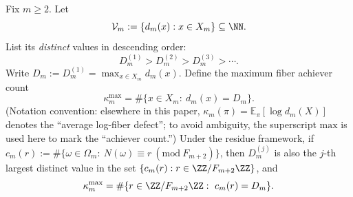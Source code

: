 \begin{definition}\label{def:pom-top-fiber-spectrum}
Fix \(m\ge 2\). Let
\[
\mathcal{V}_m:=\{d_m(x):x\in X_m\}\subseteq \NN.
\]
List its \emph{distinct} values in descending order:
\[
D_m^{(1)} > D_m^{(2)} > D_m^{(3)} > \cdots.
\]
Write \(D_m:=D_m^{(1)}=\max_{x\in X_m}d_m(x)\). Define the maximum fiber achiever count
\[
\kappa_m^{\mathrm{max}}
=\#\{x\in X_m:\ d_m(x)=D_m\}.
\]
(Notation convention: elsewhere in this paper, \(\kappa_m(\pi)=\mathbb{E}_\pi[\log d_m(X)]\) denotes the ``average log-fiber defect''; to avoid ambiguity, the superscript \(\mathrm{max}\) is used here to mark the ``achiever count.'')
Under the residue framework, if
\(
c_m(r):=\#\{\omega\in\Omega_m:\ N(\omega)\equiv r\ (\mathrm{mod}\ F_{m+2})\}
\),
then \(D_m^{(j)}\) is also the \(j\)-th largest distinct value in the set \(\{c_m(r):r\in\ZZ/F_{m+2}\ZZ\}\), and
\[
\kappa_m^{\mathrm{max}}=\#\{r\in\ZZ/F_{m+2}\ZZ:\ c_m(r)=D_m\}.
\]
\end{definition}



